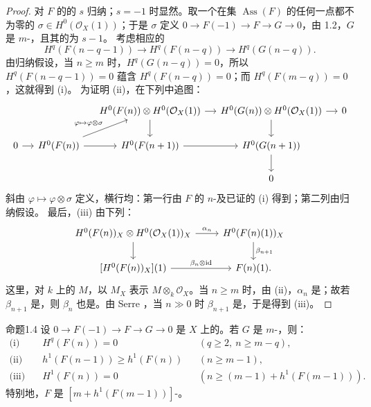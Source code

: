 \begin{proof}
对 $F$ 的的 $s$ 归纳；$s=-1$ 时显然。取一个在集 $\operatorname{Ass}(F)$ 的任何一点都不为零的 $\sigma\in H^0(\mathcal O_X(1))$；于是 $\sigma$ 定义 $0\to F(-1)\to F\to G\to0$，由 1.2，$G$ 是 $m$-，且其的为 $s-1$。
考虑相应的
\[H^q(F(n-q-1))\longrightarrow H^q(F(n-q))\longrightarrow H^q(G(n-q)).\]
由归纳假设，当 $n\geq m$ 时，$H^q(G(n-q))=0$，所以 $H^q(F(n-q-1))=0$ 蕴含 $H^q(F(n-q))=0$；而 $H^q(F(m-q))=0$，这就得到 (i)。
为证明 (ii)，在下列中追图：
\[
\begin{tikzcd}[column sep=small]
&& H^0(F(n))\otimes H^0(\mathcal O_X(1)) \arrow[r]\arrow[d]
& H^0(G(n))\otimes H^0(\mathcal O_X(1)) \arrow[r]\arrow[d] &0\\
0\arrow[r]& H^0(F(n))\arrow[r]\arrow[ur,"{\varphi\mapsto\varphi\otimes\sigma}"] & H^0(F(n+1))\arrow[r] & H^0(G(n+1))\arrow[d]\\
&&&0
\end{tikzcd}
\]
斜由 $\varphi\mapsto\varphi\otimes\sigma$ 定义，横行均：第一行由 $F$ 的 $n$-及已证的 (i) 得到；第二列由归纳假设。
最后，(iii) 由下列：
\[
\begin{tikzcd}
H^0(F(n))_X\otimes H^0(\mathcal O_X(1))_X \arrow[r,"\alpha_n"]\arrow[d]
& H^0(F(n)(1))_X\arrow[d,"\beta_{n+1}"]\\
{[H^0(F(n))_X](1)}\arrow[r,"\beta_n\otimes\mathrm{id}"]&F(n)(1).
\end{tikzcd}
\]
这里，对 $k$ 上的 $M$，以 $M_X$ 表示 $M\otimes_k\mathcal O_X$。当 $n\geq m$ 时，由 (ii)，$\alpha_n$ 是；故若 $\beta_{n+1}$ 是，则 $\beta_n$ 也是。由 Serre ，当 $n\gg0$ 时 $\beta_{n+1}$ 是，于是得到 (iii)。
\end{proof}
\begin{SGAresult}{命题}{1.4}
设 $0\to F(-1)\to F\to G\to0$ 是 $X$ 上的。若 $G$ 是 $m$-，则：
\begin{align*}
\text{(i)}\quad&H^q(F(n))=0 &&(q\geq2,\ n\geq m-q),\\
\text{(ii)}\quad&h^1(F(n-1))\geq h^1(F(n)) &&(n\geq m-1),\\
\text{(iii)}\quad&H^1(F(n))=0 &&(n\geq (m-1)+h^1(F(m-1))).
\end{align*}
特别地，$F$ 是 $[m+h^1(F(m-1))]$-。
\end{SGAresult}
